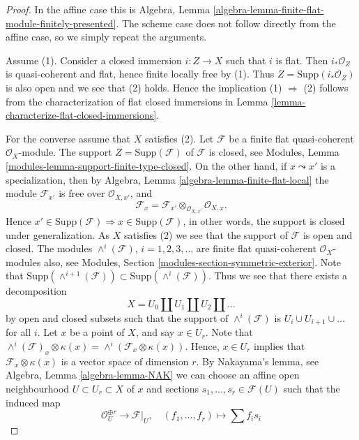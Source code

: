 \begin{proof}
In the affine case this is
Algebra, Lemma \ref{algebra-lemma-finite-flat-module-finitely-presented}.
The scheme case does not follow directly from the affine case, so we
simply repeat the arguments.

\medskip\noindent
Assume (1). Consider a closed immersion $i : Z \to X$ such that $i$ is flat.
Then $i_*\mathcal{O}_Z$ is quasi-coherent and flat, hence finite locally
free by (1). Thus $Z = \text{Supp}(i_*\mathcal{O}_Z)$ is also open and we see
that (2) holds. Hence the implication (1) $\Rightarrow$ (2) follows from
the characterization of flat closed immersions in
Lemma \ref{lemma-characterize-flat-closed-immersions}.

\medskip\noindent
For the converse assume that $X$ satisfies (2).
Let $\mathcal{F}$ be a finite flat quasi-coherent $\mathcal{O}_X$-module.
The support $Z = \text{Supp}(\mathcal{F})$ of $\mathcal{F}$ is closed, see
Modules, Lemma \ref{modules-lemma-support-finite-type-closed}.
On the other hand, if $x \leadsto x'$ is a specialization, then by
Algebra, Lemma \ref{algebra-lemma-finite-flat-local}
the module $\mathcal{F}_{x'}$ is free over $\mathcal{O}_{X, x'}$, and
$$
\mathcal{F}_x =
\mathcal{F}_{x'} \otimes_{\mathcal{O}_{X, x'}} \mathcal{O}_{X, x}.
$$
Hence
$x' \in \text{Supp}(\mathcal{F}) \Rightarrow x \in \text{Supp}(\mathcal{F})$,
in other words, the support is closed under generalization.
As $X$ satisfies (2) we see that the support of $\mathcal{F}$
is open and closed. The modules $\wedge^i(\mathcal{F})$, $i = 1, 2, 3, \ldots$
are finite flat quasi-coherent $\mathcal{O}_X$-modules
also, see
Modules, Section \ref{modules-section-symmetric-exterior}.
Note that
$\text{Supp}(\wedge^{i + 1}(\mathcal{F})) \subset
\text{Supp}(\wedge^i(\mathcal{F}))$.
Thus we see that there exists a decomposition
$$
X = U_0 \amalg U_1 \amalg U_2 \amalg \ldots
$$
by open and closed subsets such that the support of
$\wedge^i(\mathcal{F})$ is $U_i \cup U_{i + 1} \cup \ldots$ for all $i$.
Let $x$ be a point of $X$, and say $x \in U_r$.
Note that
$\wedge^i(\mathcal{F})_x \otimes \kappa(x) =
\wedge^i(\mathcal{F}_x \otimes \kappa(x))$.
Hence, $x \in U_r$ implies that $\mathcal{F}_x \otimes \kappa(x)$
is a vector space of dimension $r$. By Nakayama's lemma, see
Algebra, Lemma \ref{algebra-lemma-NAK}
we can choose an affine open neighbourhood $U \subset U_r \subset X$
of $x$ and sections $s_1, \ldots, s_r \in \mathcal{F}(U)$ such that
the induced map
$$
\mathcal{O}_U^{\oplus r} \longrightarrow \mathcal{F}|_U, \quad
(f_1, \ldots, f_r) \longmapsto \sum f_i s_i
$$
\end{proof}
